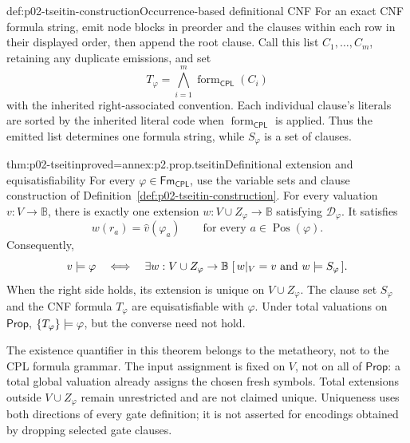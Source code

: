 \begin{hbdefinition}{def:p02-tseitin-construction}{Occurrence-based definitional CNF}
For an exact CNF formula string, emit node blocks in preorder and the clauses
within each row in their displayed order, then append the root clause.
Call this list \(C_1,\ldots,C_m\), retaining any duplicate emissions, and set
\[
 T_\varphi=\bigwedge_{i=1}^{m}\operatorname{form}_{\mathsf{CPL}}(C_i)
\]
with the inherited right-associated convention.  Each individual clause's
literals are sorted by the inherited literal code when
\(\operatorname{form}_{\mathsf{CPL}}\) is applied.  Thus the emitted list determines
one formula string, while \(S_\varphi\) is a set of clauses.
\end{hbdefinition}

\begin{hbtheorem}{thm:p02-tseitin}{proved=annex:p2.prop.tseitin}{Definitional extension and equisatisfiability}
For every \(\varphi\in\mathsf{Fm}_{\mathsf{CPL}}\), use the variable sets and clause
construction of Definition~\ref{def:p02-tseitin-construction}.
For every valuation \(v:V\to\mathbb{B}\), there is exactly one extension
\(w:V\cup Z_\varphi\to\mathbb{B}\) satisfying \(\mathcal D_\varphi\).
It satisfies
\[
 w(r_a)=\widehat v(\varphi_a)
 \qquad\text{for every }a\in\operatorname{Pos}(\varphi).
\]
Consequently,
\[
 v\models\varphi
 \quad\Longleftrightarrow\quad
 \exists w:V\cup Z_\varphi\to\mathbb{B}\;
   [\,w|_V=v\ \text{and}\ w\models S_\varphi\,].
\]
When the right side holds, its extension is unique on \(V\cup Z_\varphi\).
The clause set \(S_\varphi\) and the CNF formula \(T_\varphi\) are
equisatisfiable with \(\varphi\).  Under total valuations on \(\mathsf{Prop}\),
\(\{T_\varphi\}\models\varphi\), but the converse need not hold.
\end{hbtheorem}

The existence quantifier in this theorem belongs to the metatheory, not to
the CPL formula grammar.  The input assignment is fixed on \(V\), not on
all of \(\mathsf{Prop}\): a total global valuation already assigns the chosen fresh
symbols.  Total extensions outside \(V\cup Z_\varphi\) remain unrestricted
and are not claimed unique.  Uniqueness uses both directions of every gate
definition; it is not asserted for encodings obtained by dropping selected
gate clauses.


